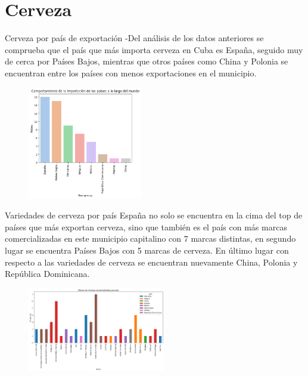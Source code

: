 \documentclass{beamer}
\begin{document}
\section{Cerveza}
    \begin{frame}{Cerveza por país de exportación}
	    -\small Del análisis de los datos anteriores se comprueba que el país que más importa cerveza en Cuba es España, seguido muy de cerca por Países Bajos, mientras que otros países como China y Polonia se encuentran entre los países con menos exportaciones en el municipio. 
      	\begin{figure}[h]
      	\centering
      	\includegraphics[width=5cm]{export.png}
      \end{figure}
    \end{frame}
    \begin{frame}{Variedades de cerveza por país}
        \small España no solo se encuentra en la cima del top de países que más exportan cerveza, sino que también es el país con más marcas comercializadas en este municipio capitalino con 7 marcas distintas, en segundo lugar se encuentra Países Bajos con 5 marcas de cerveza. En último lugar con respecto a las variedades de cerveza se encuentran nuevamente China, Polonia y República Dominicana.
       \begin{figure}[h]
       	\centering
       	\includegraphics[width=6cm]{country beer.png}
       \end{figure}
        
    \end{frame}
\end{document}
